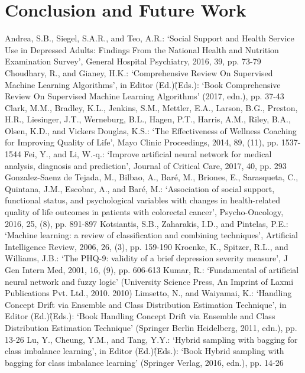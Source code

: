 \documentclass[runningheads]{llncs}
\begin{document}
\section{Conclusion and Future Work}
%
%
%
\pagebreak
\begin{thebibliography}{8}	
%	
Andrea, S.B., Siegel, S.A.R., and Teo, A.R.: ‘Social Support and Health Service Use in Depressed Adults: Findings From the National Health and Nutrition Examination Survey’, General Hospital Psychiatry, 2016, 39, pp. 73-79
Choudhary, R., and Gianey, H.K.: ‘Comprehensive Review On Supervised Machine Learning Algorithms’, in Editor (Ed.)\^(Eds.): ‘Book Comprehensive Review On Supervised Machine Learning Algorithms’ (2017, edn.), pp. 37-43
Clark, M.M., Bradley, K.L., Jenkins, S.M., Mettler, E.A., Larson, B.G., Preston, H.R., Liesinger, J.T., Werneburg, B.L., Hagen, P.T., Harris, A.M., Riley, B.A., Olsen, K.D., and Vickers Douglas, K.S.: ‘The Effectiveness of Wellness Coaching for Improving Quality of Life’, Mayo Clinic Proceedings, 2014, 89, (11), pp. 1537-1544
Fei, Y., and Li, W.-q.: ‘Improve artificial neural network for medical analysis, diagnosis and prediction’, Journal of Critical Care, 2017, 40, pp. 293
Gonzalez-Saenz de Tejada, M., Bilbao, A., Baré, M., Briones, E., Sarasqueta, C., Quintana, J.M., Escobar, A., and Baré, M.: ‘Association of social support, functional status, and psychological variables with changes in health-related quality of life outcomes in patients with colorectal cancer’, Psycho-Oncology, 2016, 25, (8), pp. 891-897
Kotsiantis, S.B., Zaharakis, I.D., and Pintelas, P.E.: ‘Machine learning: a review of classification and combining techniques’, Artificial Intelligence Review, 2006, 26, (3), pp. 159-190
Kroenke, K., Spitzer, R.L., and Williams, J.B.: ‘The PHQ-9: validity of a brief depression severity measure’, J Gen Intern Med, 2001, 16, (9), pp. 606-613
Kumar, R.: ‘Fundamental of artificial neural network and fuzzy logic’ (University Science Press, An Imprint of Laxmi Publications Pvt. Ltd., 2010. 2010)
Limsetto, N., and Waiyamai, K.: ‘Handling Concept Drift via Ensemble and Class Distribution Estimation Technique’, in Editor (Ed.)\^(Eds.): ‘Book Handling Concept Drift via Ensemble and Class Distribution Estimation Technique’ (Springer Berlin Heidelberg, 2011, edn.), pp. 13-26
Lu, Y., Cheung, Y.M., and Tang, Y.Y.: ‘Hybrid sampling with bagging for class imbalance learning’, in Editor (Ed.)\^(Eds.): ‘Book Hybrid sampling with bagging for class imbalance learning’ (Springer Verlag, 2016, edn.), pp. 14-26

\end{thebibliography}
\end{document}
